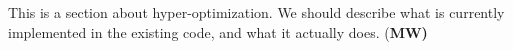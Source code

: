 This is a section about hyper-optimization. We should describe what is currently
implemented in the existing code, and what it actually does. {(\bf MW)}